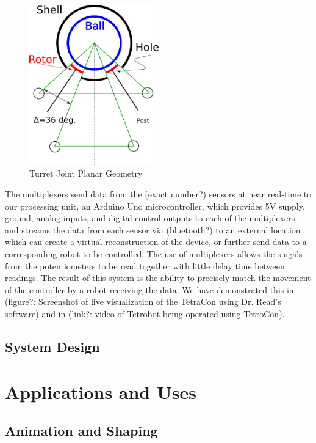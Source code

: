 \documentclass[11pt]{article}
\begin{document}
\begin{figure}[H]
  \centering
  \includegraphics[width=0.5\textwidth]{figures/SimplifiedConstraintDrawing.png}
    \caption[Turret Joint Planar Geometry]{Turret Joint Planar Geometry}
      \label{simplified-constraint-drawing}
\end{figure}

 The  multiplexers send data from the (exact number?) sensors at near real-time to our processing unit, an Arduino Uno microcontroller, which provides 5V supply, ground, analog inputs, and digital control outputs to each of the multiplexers, and streams the data from each sensor via (bluetooth?) to an external location which can create a virtual reconstruction of the device, or further send data to a corresponding robot to be controlled. The use of multiplexers allows the singals from the potentiometers to be read together with little delay time between readings. The result of this system is the ability to precisely match the movement of the controller by a robot receiving the data. We have demonstrated this in (figure?: Screenshot of live visualization of the TetraCon using Dr. Read's software) and in (link?: video of Tetrobot being operated using TetroCon).

\subsection{System Design}
\section{Applications and Uses}
\subsection{Animation and Shaping}
\end{document}
